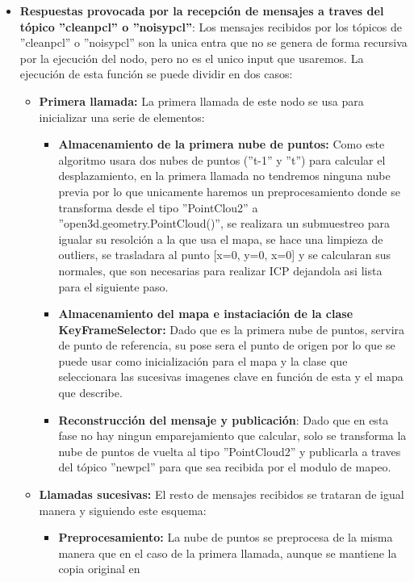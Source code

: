 \documentclass[12pt, a4paper, twoside]{article}
\begin{document}
\begin{itemize}
  \item \textbf{Respuestas provocada por la recepción de mensajes a traves del tópico ''clean\textunderscore pcl'' o ''noisy\textunderscore pcl''}:
  Los mensajes recibidos por los tópicos de ''clean\textunderscore pcl'' o ''noisy\textunderscore pcl'' son la unica entra que no se genera de forma recursiva por 
  la ejecución del nodo, pero no es el unico input que usaremos. La ejecución de esta función se puede dividir en dos casos:
  \begin{itemize}
    \item \textbf{Primera llamada:} La primera llamada de este nodo se usa para inicializar una serie de elementos:
    \begin{itemize}
      \item \textbf{Almacenamiento de la primera nube de puntos:} Como este algoritmo usara dos nubes de puntos (''t-1'' y ''t'') para calcular el desplazamiento, en 
      la primera llamada no tendremos ninguna nube previa por lo que unicamente haremos un preprocesamiento donde se transforma desde el tipo ''PointClou2'' a 
      ''open3d.geometry.PointCloud()'', se realizara un submuestreo para igualar su resolción a la que usa el mapa, se hace una limpieza de outliers, se trasladara al 
      punto [x=0, y=0, x=0] y se calcularan sus normales, que son necesarias para realizar ICP dejandola asi lista para el siguiente paso.
      \item \textbf{Almacenamiento del mapa e instaciación de la clase KeyFrameSelector:} Dado que es la primera nube de puntos, servira de punto de referencia, su pose 
      sera el punto de origen por lo que se puede usar como inicialización para el mapa y la clase que seleccionara las sucesivas imagenes clave en función de esta y el 
      mapa que describe.
      \item \textbf{Reconstrucción del mensaje y publicación}: Dado que en esta fase no hay ningun emparejamiento que calcular, solo se transforma la nube de puntos 
      de vuelta al tipo ''PointCloud2'' y publicarla a traves del tópico ''new\textunderscore pcl'' para que sea recibida por el modulo de mapeo.
    \end{itemize}
    \item \textbf{Llamadas sucesivas:} El resto de mensajes recibidos se trataran de igual manera y siguiendo este esquema:
    \begin{itemize}
      \item \textbf{Preprocesamiento:} La nube de puntos se preprocesa de la misma manera que en el caso de la primera llamada, aunque se mantiene la copia original en 

\end{itemize}
\end{itemize}
\end{itemize}
\end{document}
